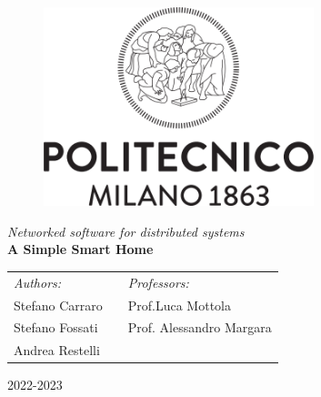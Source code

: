 \begin{titlepage}
\begin{center}
		\begin{figure}[ht]
			\centering\includegraphics[width=0.7\textwidth]{resources/Logo_Politecnico_Milano.png}
		\end{figure}
        
        \vspace{3.5cm}

        \LARGE
        \textit{Networked software for distributed systems}\\

        \vspace{0.5cm}
        \Large
        \textbf{A Simple Smart Home   }
        
        \vspace{\fill}
  
		\large
		\begin{tabularx}{\linewidth}{@{}lXl@{}}
			\textit{Authors:}  & & \textit{Professors:} \\
			Stefano Carraro      & & Prof.\@ Luca Mottola\\
			Stefano Fossati  & & Prof. Alessandro Margara \\
			Andrea Restelli & & \\
		\end{tabularx}		
		\thispagestyle{empty}

        \vspace{1cm}

        2022-2023
           
\end{center}
\end{titlepage}